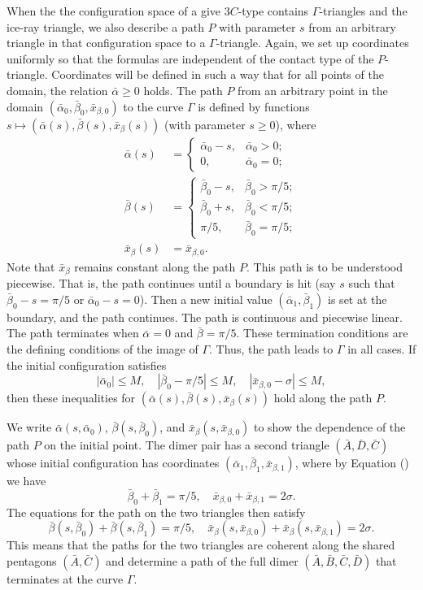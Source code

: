 When the the configuration space of a give $3C$-type contains
$\Gamma$-triangles and the ice-ray triangle, we also describe a path
$P$ with parameter $s$ from an arbitrary triangle in that
configuration space to a $\Gamma$-triangle.  Again, we set up
coordinates uniformly so that the formulas are independent of the
contact type of the $P$-triangle.  Coordinates will be defined in such
a way that for all points of the domain, the relation $\bar\alpha\ge
0$ holds.  The path $P$ from an arbitrary point in the domain
$(\bar\alpha_0,\bar\beta_0,\bar x_{\beta,0})$ to the curve $\Gamma$ is
defined by functions $s\mapsto (\bar\alpha(s),\bar\beta(s),\bar
x_\beta(s))$ (with parameter $s\ge 0$), where
\begin{align*}
\bar\alpha(s) &= \begin{cases}
\bar\alpha_0 - s, & \bar\alpha_0 > 0;\\
0, &\bar\alpha_0=0;
\end{cases}\\
\bar\beta(s) &= \begin{cases}
\bar\beta_0 - s, & \bar\beta_0 > \pi/5;\\
\bar\beta_0 + s, & \bar\beta_0 < \pi/5;\\
\pi/5, &\bar\beta_0=\pi/5;
\end{cases}\\
\bar x_\beta(s) &= \bar x_{\beta,0}.
\end{align*}
Note that $\bar x_\beta$ remains constant along the path $P$.  This
path is to be understood piecewise.  That is, the path continues until
a boundary is hit (say $s$ such that $\bar\beta_0-s = \pi/5$ or
$\bar\alpha_0-s = 0$).  Then a new initial value
$(\bar\alpha_1,\bar\beta_1)$ is set at the boundary, and the path
continues.  The path is continuous and piecewise linear.  The path
terminates when $\bar\alpha = 0$ and $\bar\beta = \pi/5$.  These
termination conditions are the defining conditions of the image of
$\Gamma$.  Thus, the path leads to $\Gamma$ in all cases.
If the initial configuration satisfies
\[
|\bar\alpha_0|\le M,\quad 
|\bar\beta_0-\pi/5|\le M,\quad |\bar x_{\beta,0}-\sigma|\le M,
\]
then these inequalities for $(\bar\alpha(s),\bar\beta(s),\bar
x_\beta(s))$ hold along the path $P$.

We write $\bar\alpha(s,\bar\alpha_0)$, $\bar\beta(s,\bar\beta_0)$, and
$\bar x_\beta(s,\bar x_{\beta,0})$ to show the dependence of the path
$P$ on the initial point.  The dimer pair has a second triangle $(\bar
A,\bar D,\bar C)$ whose initial configuration has coordinates
$(\bar\alpha_1,\bar\beta_1,\bar x_{\beta,1})$, where by Equation
() we have
\[
\bar\beta_0+\bar\beta_1 = \pi/5,\quad 
\bar x_{\beta,0}+\bar x_{\beta,1} = 2\sigma.
\]
The equations for the path on the two triangles then satisfy
\[
\bar\beta(s,\bar\beta_0)+\bar\beta(s,\bar\beta_1)=\pi/5,\quad
\bar x_{\beta}(s,\bar x_{\beta,0}) + \bar x_{\beta}(s,\bar x_{\beta,1}) = 2\sigma.
\]
This means that the paths for the two triangles are coherent along the
shared pentagons $(\bar A,\bar C)$ and determine a path of the full
dimer $(\bar A,\bar B,\bar C,\bar D)$ that terminates at the curve
$\Gamma$.



